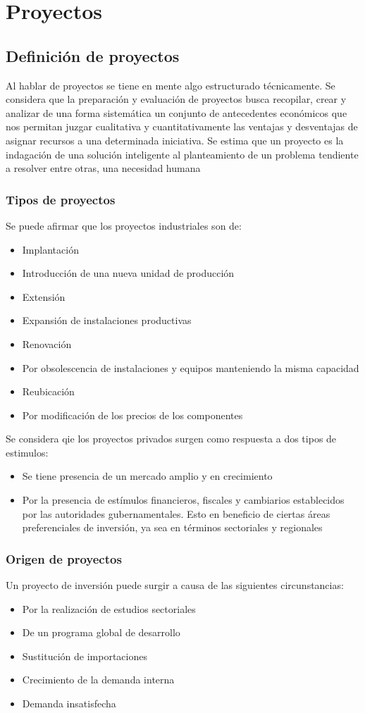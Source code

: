\chapter{Proyectos}
\setcounter{page}{1}
\section{Definición de proyectos}
Al hablar de proyectos se tiene en mente algo estructurado técnicamente. Se considera que la
preparación y evaluación de proyectos busca recopilar, crear y analizar de una forma sistemática
un conjunto de antecedentes económicos que nos permitan juzgar cualitativa y cuantitativamente
las ventajas y desventajas de asignar recursos a una determinada iniciativa. Se estima que
un proyecto es la indagación de una solución inteligente al planteamiento de un problema
tendiente a resolver entre otras, una necesidad humana
\subsection{Tipos de proyectos}
Se puede afirmar que los proyectos industriales son de:
\begin{itemize}
    \item Implantación
    \item Introducción de una nueva unidad de producción
    \item Extensión
    \item Expansión de instalaciones productivas
    \item Renovación
    \item Por obsolescencia de instalaciones y equipos manteniendo la misma capacidad
    \item Reubicación
    \item Por modificación de los precios de los componentes
\end{itemize}
Se considera qie los proyectos privados surgen como respuesta a dos tipos de estimulos:
\begin{itemize}
    \item Se tiene presencia de un mercado amplio y en crecimiento
    \item Por la presencia de estímulos financieros, fiscales y cambiarios establecidos por
las autoridades gubernamentales. Esto en beneficio de ciertas áreas preferenciales de inversión,
ya sea en términos sectoriales y regionales
\end{itemize}
\subsection{Origen de proyectos}
Un proyecto de inversión puede surgir a causa de las siguientes circunstancias:
\begin{itemize}
    \item Por la realización de estudios sectoriales
    \item De un programa global de desarrollo
    \item Sustitución de importaciones
    \item Crecimiento de la demanda interna
    \item Demanda insatisfecha
\end{itemize}